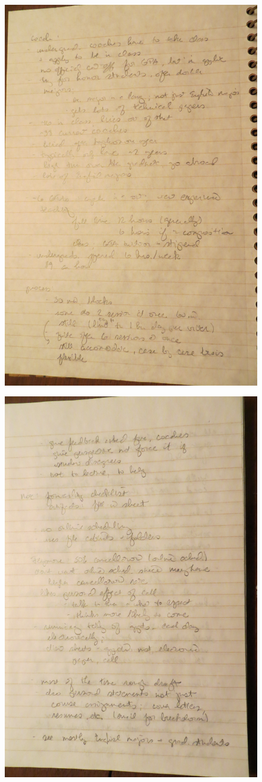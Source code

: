 \documentclass[12pt]{article} %
\begin{document}
  \begin{figure}[H]
  \centering
  \includegraphics[width=0.75\linewidth]{RAZ_raw_notes2}
  \caption{}
  \label{fig:rn2}
  \end{figure}
  \begin{figure}[H]
  \centering
  \includegraphics[width=0.75\linewidth]{RAZ_raw_notes3}
  \caption{}
  \label{fig:rn3}
  \end{figure}
\end{document}
